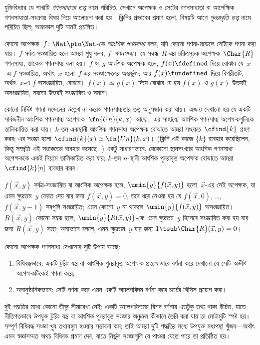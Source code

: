 \documentclass[../../../include/open-logic-section]{subfiles}
\begin{document}

যুক্তিবিদ্যার যে শাখাটি \emph{গণনসাধ্যতা তত্ত্ব} নামে পরিচিত, সেখানে
অপেক্ষক ও সেটের গণনসাধ্যতা বা আপেক্ষিক গণনসাধ্যতা-সংক্রান্ত বিষয় নিয়ে
আলোচনা করা হয়। ক্লিনির প্রভাবের প্রমাণ হলো, বিষয়টি আগে
\emph{পুনরাবৃত্তি তত্ত্ব} নামে পরিচিত ছিল; আজকাল দুটি নামই প্রচলিত।

কোনো অপেক্ষক~$f\colon \Nat \pto \Nat$-কে \emph{আংশিক গণনসাধ্য} বলব,
যদি কোনো গণনা-মডেলে সেটিকে গণনা করা যায়। $f$ সর্বত্র-সংজ্ঞায়িত হলে
আমরা শুধু বলব, $f$~\emph{গণনসাধ্য}। যে সম্বন্ধ~$R$-এর চরিত্রসূচক
অপেক্ষক~$\Char{R}$ গণনসাধ্য, তাকেও গণনসাধ্য বলা হয়। $f$ ও~$g$ আংশিক
অপেক্ষক হলে, $f(x) \fdefined$ দিয়ে বোঝাব যে~$x$-এ $f$ সংজ্ঞায়িত,
অর্থাৎ~$x$ হলো~$f$-এর সংজ্ঞাক্ষেত্রের অন্তর্ভুক্ত; আর $f(x)
\fundefined$ দিয়ে বিপরীতটি, অর্থাৎ~$x$-এ $f$ অসংজ্ঞায়িত, বোঝাব।
$f(x) \simeq g(x)$ দিয়ে বোঝাব যে হয় $f(x)$ ও $g(x)$ উভয়ই
অসংজ্ঞায়িত, নয়তো উভয়ই সংজ্ঞায়িত ও সমান।

কোনো নির্দিষ্ট গণনা-মডেলের উল্লেখ না করেও গণনসাধ্যতার তত্ত্ব অনুসন্ধান
করা যায়। এজন্য দেখানো হয় যে একটি সার্বজনীন আংশিক গণনসাধ্য
অপেক্ষক~$\fn{Un}(k, x)$ আছে। এর সাহায্যে আংশিক গণনসাধ্য অপেক্ষকগুলিকে
তালিকায়িত করা যায়। $k$-তম একস্থানী আংশিক গণনসাধ্য অপেক্ষক বোঝাতে আমরা
সংকেত~$\cfind{k}$ গ্রহণ করব; এর সংজ্ঞা হলো
$\cfind{k}(x) \simeq \fn{Un}(k, x)$। (ক্লিনি এই কাজে $\{ k \}$ ব্যবহার
করেছিলেন, কিন্তু সম্প্রতি এই সংকেতের ব্যবহার কমেছে।) একটু সাধারণভাবে,
যেকোনো স্থানসংখ্যার আংশিক গণনসাধ্য অপেক্ষককে একই নিয়মে তালিকায়িত করা
যায়; $k$-তম $n$-স্থানী আংশিক পুনরাবৃত্ত অপেক্ষক বোঝাতে আমরা
$\cfind{k}[n]$ ব্যবহার করব।

$f(\vec x, y)$ সর্বত্র-সংজ্ঞায়িত বা আংশিক অপেক্ষক হলে,
$\umin{y}{f (\vec x, y)}$ হলো~$\vec x$-এর সেই অপেক্ষক, যা এমন ক্ষুদ্রতম~$y$
ফেরত দেয় যার জন্য $f(\vec x, y) = 0$, তবে ধরে নেওয়া হয় যে
$f(\vec x, 0)$, \dots, $f(\vec x, y-1)$ সবগুলি সংজ্ঞায়িত; এমন কোনো~$y$
না থাকলে $\umin{y}{f (\vec x, y)}$ অসংজ্ঞায়িত। $R(\vec x, y)$ কোনো
সম্বন্ধ হলে, $\umin{y}{R(\vec x, y)}$-কে এমন ক্ষুদ্রতম~$y$ হিসেবে
সংজ্ঞায়িত করা হয় যার জন্য $R(\vec x, y)$ সত্য; অন্যভাবে বললে, এমন
ক্ষুদ্রতম~$y$ যার জন্য $1 \tsub \Char{R}(\vec x, y) = 0$।

কোনো অপেক্ষক গণনসাধ্য দেখানোর দুটি উপায় আছে:
\begin{enumerate}
\item বিধিবদ্ধভাবে: একটি টুরিং যন্ত্র বা আংশিক পুনরাবৃত্ত অপেক্ষক
  প্রত্যক্ষভাবে বর্ণনা করে দেখানো যে সেটি অভীষ্ট অপেক্ষকটিকেই গণনা করে;
\item অনানুষ্ঠানিকভাবে: সেটি গণনা করে এমন একটি অ্যালগরিদম বর্ণনা করে
  চার্চের থিসিস প্রয়োগ করা।
\end{enumerate}
দুই পদ্ধতির মধ্যে কোনো তীক্ষ্ণ সীমারেখা নেই; একটি অ্যালগরিদমের বিশদ
বর্ণনায় এতটুকু তথ্য থাকা উচিত, যাতে নীতিগতভাবে উপযুক্ত টুরিং যন্ত্র বা
আংশিক পুনরাবৃত্ত সংজ্ঞার অনুক্রম কীভাবে তৈরি করা যায় তা মোটামুটি স্পষ্ট
হয়। সম্পূর্ণ বিধিবদ্ধ সংজ্ঞা খুব তথ্যবহুল হওয়ার সম্ভাবনা কম; তাই আমরা
দুটি পদ্ধতির মধ্যে উপযুক্ত মধ্যপন্থা খুঁজব—অর্থাৎ এমন স্বজ্ঞাসম্মত অথচ
বিধিবদ্ধ প্রমাণ দেব, যাতে নির্ভুল সংজ্ঞাগুলি যে পাওয়া যেতে পারে তা
প্রতিষ্ঠিত হয়।
\end{document}
